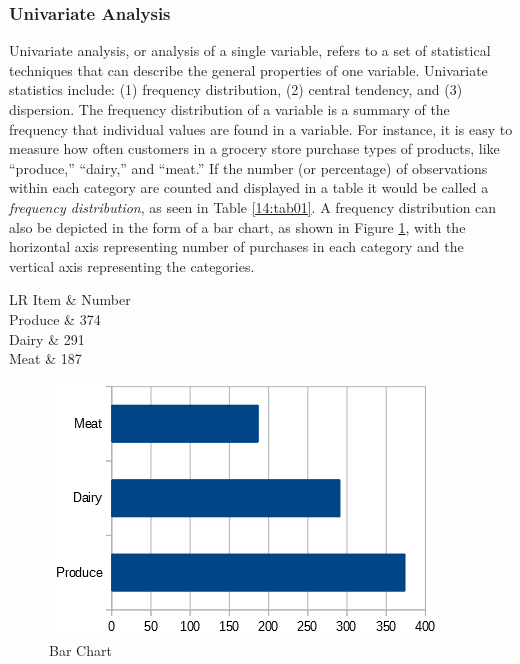 \subsubsection{Univariate Analysis}

Univariate analysis, or analysis of a single variable, refers to a set of statistical techniques that can describe the general properties of one variable. Univariate statistics include: (1) frequency distribution, (2) central tendency, and (3) dispersion. The frequency distribution of a variable is a summary of the frequency that individual values are found in a variable. For instance, it is easy to measure how often customers in a grocery store purchase types of products, like ``produce,'' ``dairy,'' and ``meat.'' If the number (or percentage) of observations within each category are counted and displayed in a table it would be called a \textit{frequency distribution}, as seen in Table \ref{14:tab01}. A frequency distribution can also be depicted in the form of a bar chart, as shown in Figure \ref{14:fig01}, with the horizontal axis representing number of purchases in each category and the vertical axis representing the categories.

\begin{table}[H]
	\centering
	\begin{tabulary}{\linewidth}{LR}
		\hline
		Item & Number \\ 
		\hline
		Produce & 374 \\ 
		Dairy & 291 \\ 
		Meat & 187 \\ 
		\hline
	\end{tabulary} 
	\caption{Frequency Table}
	\label{14:tab01}
\end{table}

\vspace{.15in}

\begin{figure}[H]
	\centering
	\includegraphics[width=\maxwidth{.95\linewidth}]{gfx/14-BarChart}
	\caption{Bar Chart}
	\label{14:fig01}
\end{figure}


